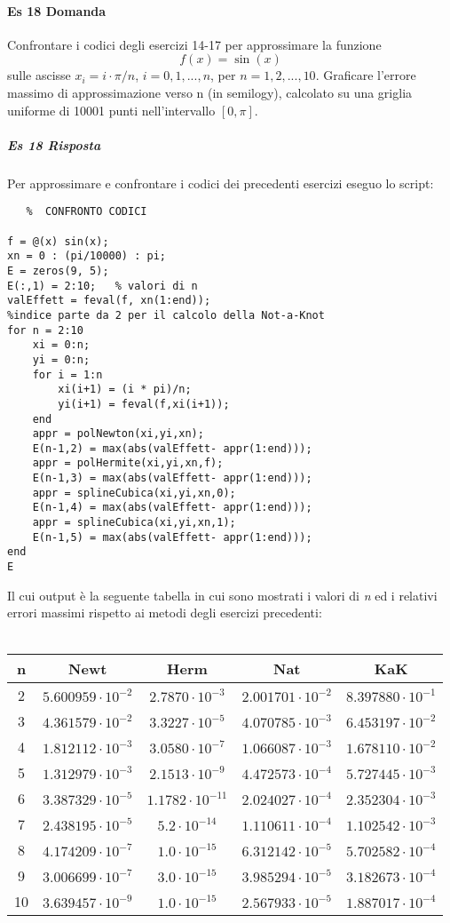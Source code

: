 \documentclass[a4paper]{report}
\begin{document}
\paragraph{Es 18 Domanda}
Confrontare i codici degli esercizi 14-17 per approssimare la funzione
\[
f(x) = \sin(x)
\]
sulle ascisse $x_i = i \cdotp \pi/n$, $i = 0,1,...,n$, per $n = 1, 2,...,10$. Graficare l'errore massimo di approssimazione verso n (in semilogy), calcolato su una griglia uniforme di 10001 punti nell'intervallo $[0,\pi]$.
\subparagraph{Es 18 Risposta}
Per approssimare e confrontare i codici dei precedenti esercizi eseguo lo script:
\begin{lstlisting}	 %	CONFRONTO CODICI

f = @(x) sin(x);
xn = 0 : (pi/10000) : pi;
E = zeros(9, 5);
E(:,1) = 2:10;   % valori di n
valEffett = feval(f, xn(1:end));
%indice parte da 2 per il calcolo della Not-a-Knot
for n = 2:10 
	xi = 0:n;
	yi = 0:n;
	for i = 1:n
		xi(i+1) = (i * pi)/n;
		yi(i+1) = feval(f,xi(i+1));
	end
	appr = polNewton(xi,yi,xn);
	E(n-1,2) = max(abs(valEffett- appr(1:end)));
	appr = polHermite(xi,yi,xn,f);
	E(n-1,3) = max(abs(valEffett- appr(1:end)));
	appr = splineCubica(xi,yi,xn,0);
	E(n-1,4) = max(abs(valEffett- appr(1:end)));
	appr = splineCubica(xi,yi,xn,1);
	E(n-1,5) = max(abs(valEffett- appr(1:end)));
end
E
\end{lstlisting}
Il cui output è la seguente tabella in cui sono mostrati i valori di \emph{n} ed i relativi errori massimi rispetto ai metodi degli esercizi precedenti:\\\\
\begin{tabular}{|c|c|c|c|c|}
	\hline
	n&Newt&Herm&Nat&KaK\\ \hline
	2&$5.600959\cdot 10^{-2}$&$2.7870\cdot 10^{-3} $&$2.001701\cdot 10^{-2}$&$8.397880\cdot 10^{-1}$\\ \hline
3&$4.361579\cdot 10^{-2}$&$3.3227\cdot 10^{-5} $&$4.070785\cdot 10^{-3}$&$6.453197\cdot 10^{-2}$\\ \hline
4&$1.812112\cdot 10^{-3}$&$3.0580\cdot 10^{-7} $&$1.066087\cdot 10^{-3}$&$1.678110\cdot 10^{-2}$\\ \hline
5&$1.312979\cdot 10^{-3}$&$2.1513\cdot 10^{-9} $&$4.472573\cdot 10^{-4}$&$5.727445\cdot 10^{-3}$\\ \hline
6&$3.387329\cdot 10^{-5}$&$1.1782\cdot 10^{-11}$&$2.024027\cdot 10^{-4}$&$2.352304\cdot 10^{-3}$\\ \hline
7&$2.438195\cdot 10^{-5}$&$5.2   \cdot 10^{-14}$&$1.110611\cdot 10^{-4}$&$1.102542\cdot 10^{-3}$\\ \hline
8&$4.174209\cdot 10^{-7}$&$1.0   \cdot 10^{-15}$&$6.312142\cdot 10^{-5}$&$5.702582\cdot 10^{-4}$\\ \hline
9&$3.006699\cdot 10^{-7}$&$3.0   \cdot 10^{-15}$&$3.985294\cdot 10^{-5}$&$3.182673\cdot 10^{-4}$\\ \hline
10&$3.639457\cdot 10^{-9}$&$1.0   \cdot 10^{-15}$&$2.567933\cdot 10^{-5}$&$1.887017\cdot 10^{-4}$\\ \hline
\end{tabular}
\end{document}
